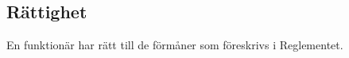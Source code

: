 \documentclass[10pt]{article}
\begin{document}
    \subsection{Rättighet}
    En funktionär har rätt till de förmåner som föreskrivs i Reglementet.
    \newpage
    
    
    
    
    
    
    
    
\end{document}
